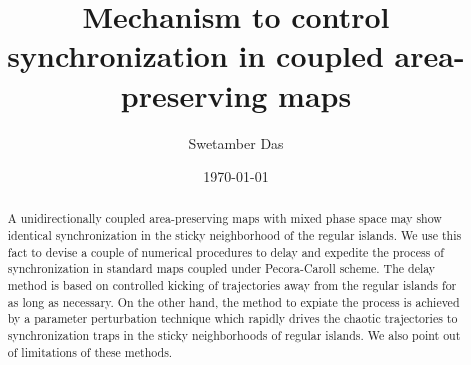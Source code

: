 \documentclass[reprint,superscriptaddress,amsmath,amssymb,aps,pre]{revtex4-1}
\begin{document}
\title{Mechanism to control synchronization in coupled area-preserving maps}

\author{Swetamber Das}

\date{\today}

\begin{abstract}
 A unidirectionally coupled area-preserving maps with mixed phase space may 
show identical synchronization in the sticky neighborhood of the regular 
islands. We use this fact to devise a couple of numerical procedures to 
delay and expedite the process of synchronization in standard maps coupled 
under  Pecora-Caroll scheme. The delay method is based on controlled 
kicking of trajectories away from the regular islands for as long as 
necessary. On the other hand, the method to expiate the process is
achieved by a parameter perturbation technique which rapidly drives the 
chaotic trajectories to synchronization traps in the sticky neighborhoods 
of regular islands. We also point out of limitations of these methods.  
\end{abstract}


\maketitle
\end{document}

